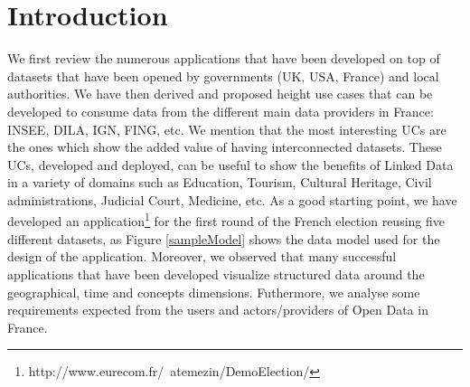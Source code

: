 \documentclass[a4paper,11pt]{report}
\begin{document}
\section{Introduction}
We first review the numerous applications that have been developed on top of datasets that have been opened by governments (UK, USA, France) and local authorities. We have then derived and proposed height use cases  that can be developed to consume data from the different main data providers in France: INSEE, DILA, IGN, FING, etc. We mention that the most interesting UCs are the ones which show the added value of having interconnected datasets. These UCs,  developed and deployed, can be useful to show the benefits of Linked Data in a variety of domains such as Education, Tourism, Cultural Heritage, Civil administrations, Judicial Court, Medicine, etc. As a good starting point, we have developed an application\footnote{http://www.eurecom.fr/~atemezin/DemoElection/} for the first round of the French election reusing five different datasets, as Figure \ref{sampleModel} shows the data model used for the design of the application. Moreover, we observed that many successful applications that have been developed visualize structured data around the geographical, time and concepts dimensions. Futhermore, we analyse some requirements expected from the users and actors/providers of Open Data in France. 
\end{document}
